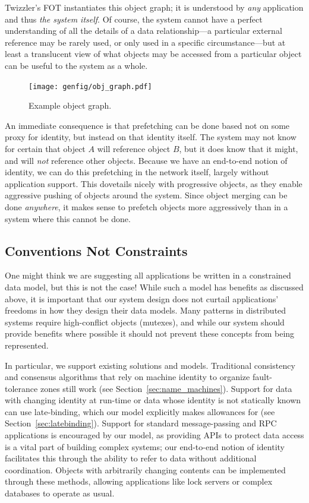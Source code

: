 Twizzler's FOT instantiates this object graph; it is understood by \emph{any} application
and thus \emph{the system itself}.
Of course, the system cannot have a
perfect understanding of all the details of a data relationship---a particular external reference
may be rarely used, or only used in a specific circumstance---but at least a translucent view of
what objects may be accessed from a particular object can be useful to the system as a whole.

\begin{figure}
    \centering
    \texttt{[image: genfig/obj\_graph.pdf]}
    \caption{Example object graph.}
    \label{fig:ograph}
\end{figure}

An immediate consequence is that prefetching can be done based not on some proxy for identity,
but instead on that identity itself. The system may not know for certain that object $A$ will
reference object $B$, but it does know that it might, and will \emph{not} reference other objects.
Because we have an end-to-end notion of identity, we can do this prefetching in the network itself,
largely without application support.
This dovetails nicely with progressive objects, as they enable aggressive pushing of objects around
the system. Since object merging can be done \emph{anywhere}, it makes sense to prefetch objects
more aggressively than in a system where this cannot be done.


\subsection{Conventions Not Constraints}

One might think we are suggesting all applications be written in a constrained data
model, but this is not the case! While such a model has benefits as discussed above, it is
important that our system design does not curtail applications' freedoms in how they design their
data models. Many patterns in distributed systems require high-conflict objects (\eg mutexes), and
while our system should provide benefits where possible it should not prevent these concepts from
being represented.

In particular, we support existing solutions and models. Traditional consistency and
consensus algorithms that rely on machine identity to organize fault-tolerance zones still work (see
Section~\ref{sec:name_machines}). Support for data with changing identity at run-time or data whose
identity is not statically known can use late-binding, which our model explicitly makes
allowances for (see Section~\ref{sec:latebinding}). Support for standard message-passing and RPC
applications is encouraged by our model, as providing APIs to protect data access is a vital part of
building complex systems; our end-to-end notion of identity facilitates this through the ability to
refer to data without additional coordination. Objects with arbitrarily changing contents can be
implemented through these methods, allowing applications like lock servers or complex databases to
operate as usual.

